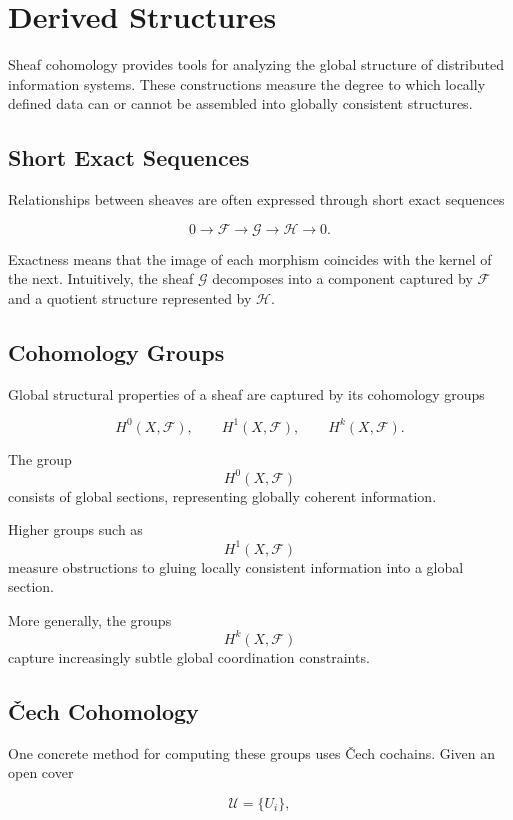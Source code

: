 \documentclass[12pt]{article}
\begin{document}
\section{Derived Structures}

Sheaf cohomology provides tools for analyzing the global structure of distributed information systems. These constructions measure the degree to which locally defined data can or cannot be assembled into globally consistent structures.

\subsection{Short Exact Sequences}

Relationships between sheaves are often expressed through short exact sequences

\[
0 \rightarrow \mathcal{F} \rightarrow \mathcal{G} \rightarrow \mathcal{H} \rightarrow 0.
\]

Exactness means that the image of each morphism coincides with the kernel of the next. Intuitively, the sheaf $\mathcal{G}$ decomposes into a component captured by $\mathcal{F}$ and a quotient structure represented by $\mathcal{H}$.

\subsection{Cohomology Groups}

Global structural properties of a sheaf are captured by its cohomology groups

\[
H^0(X,\mathcal{F}), \qquad H^1(X,\mathcal{F}), \qquad H^k(X,\mathcal{F}).
\]

The group
\[
H^0(X,\mathcal{F})
\]
consists of global sections, representing globally coherent information.

Higher groups such as
\[
H^1(X,\mathcal{F})
\]
measure obstructions to gluing locally consistent information into a global section.

More generally, the groups
\[
H^k(X,\mathcal{F})
\]
capture increasingly subtle global coordination constraints.

\subsection{Čech Cohomology}

One concrete method for computing these groups uses Čech cochains. Given an open cover

\[
\mathcal{U} = \{U_i\},
\]
\end{document}
